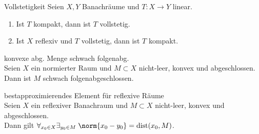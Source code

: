 \begin{Satz}{Vollstetigkeit}
    Seien $X, Y$ Banachräume und $T\colon X \rightarrow Y$ linear.
    \begin{enumerate}
        \item
        Ist $T$ kompakt, dann ist $T$ vollstetig.
        
        \item
        Ist $X$ reflexiv und $T$ vollstetig, dann ist $T$ kompakt.
    \end{enumerate}
\end{Satz}

\linie

\begin{Satz}{konvexe abg. Menge schwach folgenabg.}\\
    Seien $X$ ein normierter Raum und $M \subset X$
    nicht-leer, konvex und abgeschlossen.\\
    Dann ist $M$ schwach folgenabgeschlossen.
\end{Satz}

\linie

\begin{Satz}{bestapproximierendes Element für reflexive Räume}\\
    Seien $X$ ein reflexiver Banachraum und $M \subset X$
    nicht-leer, konvex und abgeschlossen.\\
    Dann gilt $\forall_{x_0 \in X} \exists_{y_0 \in M}\;
    \norm{x_0 - y_0} = \dist(x_0, M)$.
\end{Satz}

\pagebreak
